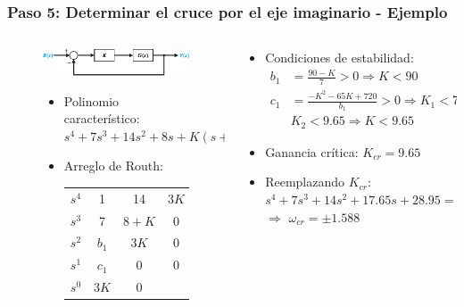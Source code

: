 \documentclass[aspectratio=169,handout]{beamer}
\theoremstyle{definition}
\theoremstyle{plain}
\theoremstyle{remark}
\begin{document}
\begin{frame}[c]\frametitle{Paso 5: Determinar el cruce por el eje imaginario - Ejemplo}
\begin{columns}
	\begin{column}{0.5\textwidth}
	\begin{figure}
		\includegraphics[width=6cm]{images/controlsystem.eps}
		\begin{itemize}
			\item Polinomio característico:	$s^4 + 7 s^3 + 14s^2 + 8s + K(s+3) = 0$
			\item Arreglo de Routh:
			\begin{tabular}{c|ccc}
				$s^4$ & 1 & 14 & $3K$\\
				$s^3$ & 7 & $8+K$ & 0\\
				$s^2$ & $b_1$ & $3K$ & 0\\
				$s^1$ & $c_1$ & 0 & 0\\
				$s^0$ & $3K$ & 0
			\end{tabular}
		\end{itemize}
	\end{figure}
	\end{column}
	\begin{column}{0.5\textwidth}
		\begin{itemize}
			\item Condiciones de estabilidad:
			\begin{align*}
				b_1 &= \frac{90-K}{7} > 0 \Rightarrow K < 90\\
				c_1 &= \frac{-K^2-65K+720}{b_1} > 0 \Rightarrow K_1 < 74.64\ \&\ \\
				&K_2 < 9.65 \Rightarrow K < 9.65
			\end{align*}
			\item Ganancia crítica: $K_{cr} = 9.65$
			\item Reemplazando $K_{cr}$:	$s^4 + 7 s^3 + 14s^2 + 17.65s + 28.95 = 0$ $\Rightarrow$ $\omega_{cr} = \pm 1.588$
		\end{itemize}
	\end{column}
\end{columns}
\end{frame}
\end{document}
